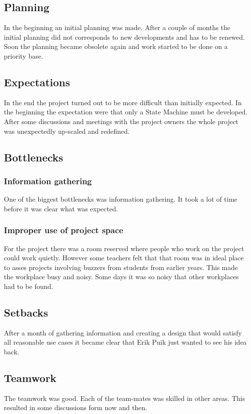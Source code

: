 \documentclass[12pt,a4paper]{report}
\begin{document}
\subsection{Planning}
In the beginning an initial planning was made. 
After a couple of months the initial planning did not corresponds to new developments and has to be renewed.
Soon the planning became obsolete again and work started to be done on a priority base.

\subsection{Expectations}
In the end the project turned out to be more difficult than initially expected.
In the beginning the expectation were that only a State Machine must be developed.
After some discussions and meetings with the project owners the whole project was unexpectedly up-scaled and redefined.

\subsection{Bottlenecks}
\subsubsection{Information gathering}
One of the biggest bottlenecks was information gathering.
It took a lot of time before it was clear what was expected.

\subsubsection{Improper use of project space}
For the project there was a room reserved where people who work on the project could work quietly.
However some teachers felt that that room was in ideal place to asses projects involving buzzers from students from earlier years.
This made the workplace busy and noisy.
Some days it was so noisy that other workplaces had to be found.

\subsection{Setbacks}
After a month of gathering information and creating a design that would satisfy all reasonable use cases it became clear that Erik Puik just wanted to see his idea back.

\subsection{Teamwork}
The teamwork was good. 
Each of the team-mates was skilled in other areas.
This resulted in some discussions form now and then.
\end{document}
